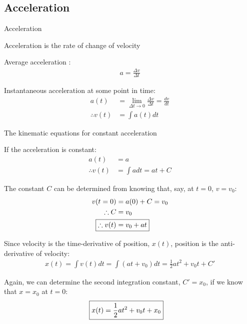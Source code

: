 \documentclass[aspectratio=169,
hyperref={colorlinks,urlcolor=blue}
]{beamer}
\begin{document}




\subsection{Acceleration}
\label{subsec:acceleration}
\begin{bulletframe}{Acceleration}
\item Acceleration is the rate of change of velocity
\item Average acceleration :
\begin{align*}
a=\frac{\Delta v}{\Delta t}
\end{align*}
\item Instantaneous acceleration at some point in time:
\begin{align*}
a(t)&=\lim_{\Delta t \to 0}\frac{\Delta v}{\Delta t}=\frac{dv}{dt}\\
\therefore v(t) &= \int a(t) dt
\end{align*}
\end{bulletframe}



\begin{bulletframe}{The kinematic equations for constant acceleration}
\scriptsize
\item<1-> If the acceleration is constant:
\begin{align*}
a(t) &= a\\
\therefore v(t) &= \int adt = at+C
\end{align*}
\item<2-> The constant $C$ can be determined from knowing that, say, at $t=0$, $v=v_0$:
\begin{align*}
v(t=0)&=a(0)+C = v_0\\
\therefore C&=v_0\\
\Aboxed{\therefore v(t)&= v_0 + at}
\end{align*}
\item<3-> Since velocity is the time-derivative of position, $x(t)$, position is the anti-derivative of velocity:
\begin{align*}
x(t)=\int v(t) dt = \int (at+v_0) dt = \frac{1}{2}at^2+v_0 t+C'
\end{align*}
\item<4-> Again, we can determine the second integration constant, $C'=x_0$, if we know that $x =x_0$  at $t=0$:
\begin{align*}
\Aboxed{ x(t) = \frac{1}{2}at^2+v_0 t+x_0}
\end{align*}
\end{bulletframe}
\end{document}
